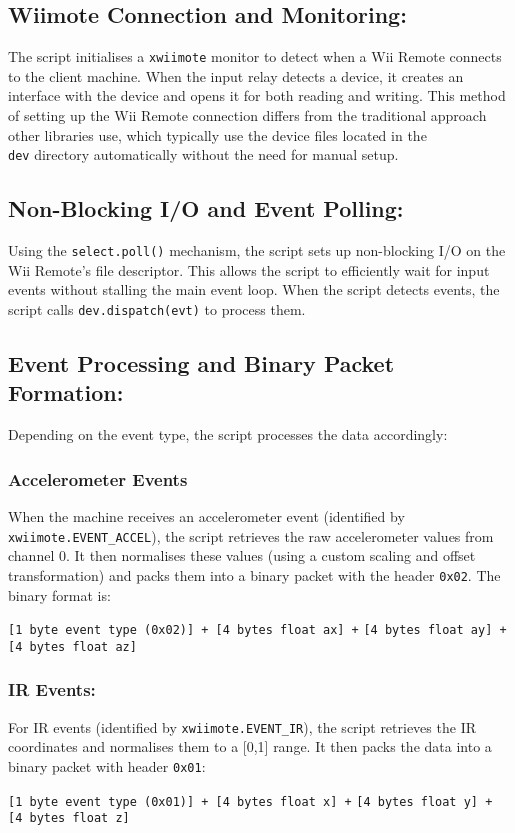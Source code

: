 \subsection{Wiimote Connection and Monitoring:}
The script initialises a \texttt{xwiimote} monitor to detect when a Wii Remote connects to the client machine. When the input relay detects a device, it creates an interface with the device and opens it for both reading and writing. This method of setting up the Wii Remote connection differs from the traditional approach other libraries use, which typically use the device files located in the \texttt{\\dev} directory automatically without the need for manual setup.

\subsection{Non-Blocking I/O and Event Polling:}
Using the \texttt{select.poll()} mechanism, the script sets up non-blocking I/O on the Wii Remote’s file descriptor. This allows the script to efficiently wait for input events without stalling the main event loop. When the script detects events, the script calls \texttt{dev.dispatch(evt)} to process them.

\subsection{Event Processing and Binary Packet Formation:}
Depending on the event type, the script processes the data accordingly:

\subsubsection{Accelerometer Events}
When the machine receives an accelerometer event (identified by \texttt{xwiimote.EVENT\_ACCEL}), the script retrieves the raw accelerometer values from channel 0. It then normalises these values (using a custom scaling and offset transformation) and packs them into a binary packet with the header \texttt{0x02}. The binary format is:
\begin{center}
	\texttt{[1 byte event type (0x02)] + [4 bytes float ax] +}
	\texttt{[4 bytes float ay] + [4 bytes float az]}
\end{center}

\subsubsection{IR Events:}
For IR events (identified by \texttt{xwiimote.EVENT\_IR}), the script retrieves the IR coordinates and normalises them to a [0,1] range. It then packs the data into a binary packet with header \texttt{0x01}:
\begin{center}
	\texttt{[1 byte event type (0x01)] + [4 bytes float x] +}
	\texttt{[4 bytes float y] + [4 bytes float z]}
\end{center}

